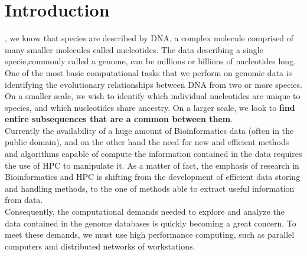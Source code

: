 \documentclass[twocolumn,twoside]{Jornadas}
\begin{document}
\section{Introduction}
, we know that species are described by DNA, a complex molecule comprised of many smaller molecules called nucleotides. The data describing a single specie,commonly called a genome, can be millions or billions of nucleotides long.\\
One of the most basic computational tasks that we perform on genomic data is identifying the evolutionary relationships between DNA from two or more species. On a smaller scale, we wish to identify which individual nucleotides are unique to species, and which nucleotides share ancestry. On a larger scale, we look to \textbf{find entire subsequences that are a common between them}.\\
Currently the availability of a huge amount of  Bioinformatics data (often in the public domain), and on the other hand the  need for new and efficient methods and algorithms capable of  compute the information contained in the data requires the use of HPC to manipulate it. As a matter of fact, the  emphasis of research in Bioinformatics and HPC is shifting from the development of efficient data storing and handling methods, to the one of methods able to  extract useful information from data.\\
Consequently, the computational demands needed to explore and analyze the data contained in the genome databases is quickly becoming a great concern. To meet these demands, we must use high performance computing, such as parallel computers and distributed networks of workstations.
\end{document}
